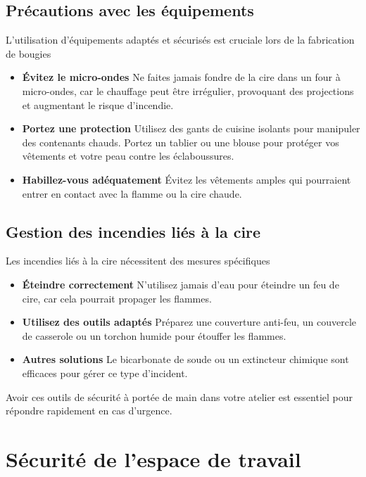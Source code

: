 \documentclass[11pt,fleqn,onecolumn,oneside]{book}
\begin{document}
\subsection*{Précautions avec les équipements}

L’utilisation d’équipements adaptés et sécurisés est cruciale lors de la fabrication de bougies
\begin{itemize}
    \item \textbf{Évitez le micro-ondes} Ne faites jamais fondre de la cire dans un four à micro-ondes, car le chauffage peut être irrégulier, provoquant des projections et augmentant le risque d’incendie.
    \item \textbf{Portez une protection} Utilisez des gants de cuisine isolants pour manipuler des contenants chauds. Portez un tablier ou une blouse pour protéger vos vêtements et votre peau contre les éclaboussures.
    \item \textbf{Habillez-vous adéquatement} Évitez les vêtements amples qui pourraient entrer en contact avec la flamme ou la cire chaude.
\end{itemize}

\subsection*{Gestion des incendies liés à la cire}

Les incendies liés à la cire nécessitent des mesures spécifiques
\begin{itemize}
    \item \textbf{Éteindre correctement} N’utilisez jamais d’eau pour éteindre un feu de cire, car cela pourrait propager les flammes.
    \item \textbf{Utilisez des outils adaptés} Préparez une couverture anti-feu, un couvercle de casserole ou un torchon humide pour étouffer les flammes.
    \item \textbf{Autres solutions} Le bicarbonate de soude ou un extincteur chimique sont efficaces pour gérer ce type d’incident.
\end{itemize}

\begin{corollary}
Avoir ces outils de sécurité à portée de main dans votre atelier est essentiel pour répondre rapidement en cas d’urgence.
\end{corollary}

\section{Sécurité de l’espace de travail}
\end{document}

